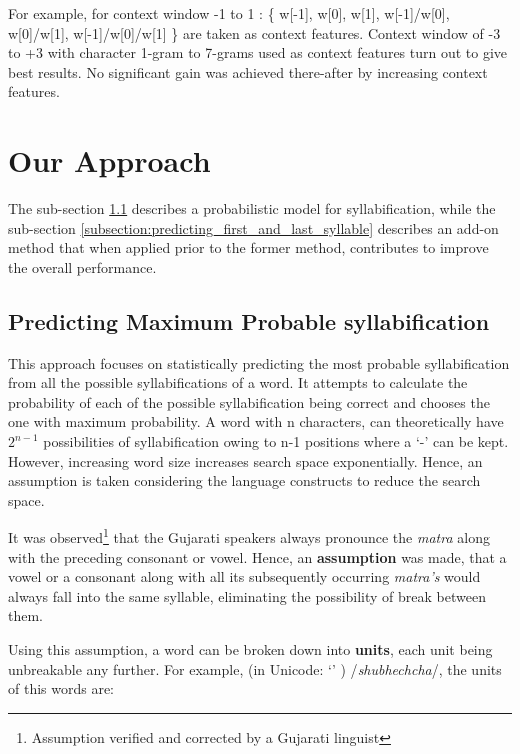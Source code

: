 \documentclass[runningheads,a4paper]{llncs}
\begin{document}
\noindent For example, for context window -1 to 1 : \{ w[-1], w[0], w[1], w[-1]/w[0], w[0]/w[1], w[-1]/w[0]/w[1] \} are taken as context features. Context window of -3 to +3 with character 1-gram to 7-grams used as context features turn out to give best results. No significant gain was achieved there-after by increasing context features. 

\section{Our Approach}
\label{section:our_approach}

The sub-section \ref{subsection:predicting_maximum_probable_syllabification} describes a probabilistic model for syllabification, while the sub-section \ref{subsection:predicting_first_and_last_syllable} describes an add-on method that when applied prior to the former method, contributes to improve the overall performance.

\subsection{Predicting Maximum Probable syllabification}
\label{subsection:predicting_maximum_probable_syllabification}

This approach focuses on statistically predicting the most probable syllabification from all the possible syllabifications of a word. It attempts to calculate the probability of each of the possible syllabification being correct and chooses the one with maximum probability. A word with n characters, can theoretically have $2^{n-1}$ possibilities of syllabification owing to n-1 positions where a `-' can be kept. However, increasing word size increases search space exponentially. Hence, an assumption is taken considering the language constructs to reduce the search space.

It was observed\footnote{Assumption verified and corrected by a Gujarati linguist} that the Gujarati speakers always pronounce the \emph{matra} along with the preceding consonant or vowel. Hence, an \textbf{assumption} was made, that a vowel or a consonant along with all its subsequently occurring \emph{matra’s} would always fall into the same syllable, eliminating the possibility of break between them.

Using this assumption, a word can be broken down into \textbf{units}, each unit being unbreakable any further. For example, {} (in Unicode: `{}\nobreak{}\nobreak{}\nobreak{}\nobreak{}\nobreak{}\nobreak{}\nobreak{}' ) /\emph{shubhechcha}/, the units of this words are:
\end{document}
